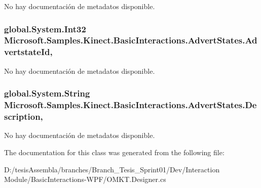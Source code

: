No hay documentación de metadatos disponible. 

\hypertarget{class_microsoft_1_1_samples_1_1_kinect_1_1_basic_interactions_1_1_advert_states_a39f4422e188680ce289c8e4d5952931d}{
\subsubsection[{Advertstate\-Id}]{\setlength{\rightskip}{0pt plus 5cm}global.\-System.\-Int32 Microsoft.\-Samples.\-Kinect.\-Basic\-Interactions.\-Advert\-States.\-Advertstate\-Id\hspace{0.3cm}{\ttfamily [get]}, {\ttfamily [set]}}}\label{class_microsoft_1_1_samples_1_1_kinect_1_1_basic_interactions_1_1_advert_states_a39f4422e188680ce289c8e4d5952931d}


No hay documentación de metadatos disponible. 

\hypertarget{class_microsoft_1_1_samples_1_1_kinect_1_1_basic_interactions_1_1_advert_states_ac4134938a625db21f835d8f718deec27}{
\subsubsection[{Description}]{\setlength{\rightskip}{0pt plus 5cm}global.\-System.\-String Microsoft.\-Samples.\-Kinect.\-Basic\-Interactions.\-Advert\-States.\-Description\hspace{0.3cm}{\ttfamily [get]}, {\ttfamily [set]}}}\label{class_microsoft_1_1_samples_1_1_kinect_1_1_basic_interactions_1_1_advert_states_ac4134938a625db21f835d8f718deec27}


No hay documentación de metadatos disponible. 



The documentation for this class was generated from the following file\-:\begin{DoxyCompactItemize}
\item 
D\-:/tesis\-Assembla/branches/\-Branch\-\_\-\-Tesis\-\_\-\-Sprint01/\-Dev/\-Interaction Module/\-Basic\-Interactions-\/\-W\-P\-F/O\-M\-K\-T.\-Designer.\-cs\end{DoxyCompactItemize}
